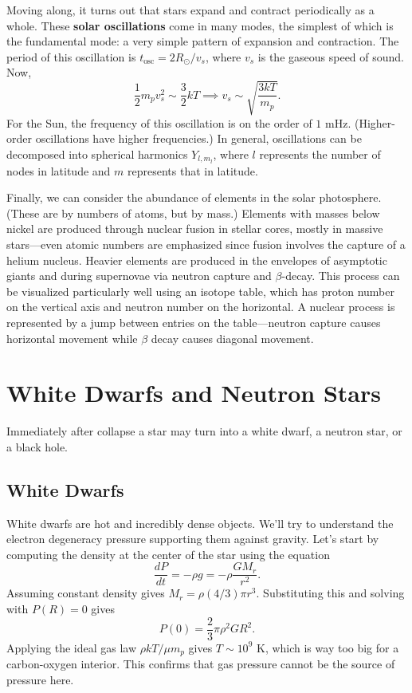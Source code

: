 \documentclass[../a062main.tex]{subfiles}
\begin{document}
Moving along, it turns out that stars expand and contract periodically as a whole.
These \textbf{solar oscillations} come in many modes, the simplest of which is the fundamental mode: a very simple pattern of expansion and contraction.
The period of this oscillation is $t_\text{osc} = 2R_\odot / v_s$, where $v_s$ is the gaseous speed of sound.
Now,
\[ \frac{1}{2} m_p v_s^2 \sim \frac{3}{2} kT \implies v_s \sim \sqrt{\frac{3kT}{m_p}}. \]
For the Sun, the frequency of this oscillation is on the order of $1 \text{ mHz}$.
(Higher-order oscillations have higher frequencies.)
In general, oscillations can be decomposed into spherical harmonics $Y_{l,m_l}$, where $l$ represents the number of nodes in latitude and $m$ represents that in latitude.

Finally, we can consider the abundance of elements in the solar photosphere.
(These are by numbers of atoms, but by mass.)
Elements with masses below nickel are produced through nuclear fusion in stellar cores, mostly in massive stars---even atomic numbers are emphasized since fusion involves the capture of a helium nucleus.
Heavier elements are produced in the envelopes of asymptotic giants and during supernovae via neutron capture and $\beta$-decay.
This process can be visualized particularly well using an isotope table, which has proton number on the vertical axis and neutron number on the horizontal.
A nuclear process is represented by a jump between entries on the table---neutron capture causes horizontal movement while $\beta$ decay causes diagonal movement.

\section{White Dwarfs and Neutron Stars}
Immediately after collapse a star may turn into a white dwarf, a neutron star, or a black hole.

\subsection*{White Dwarfs}
White dwarfs are hot and incredibly dense objects.
We'll try to understand the electron degeneracy pressure supporting them against gravity.
Let's start by computing the density at the center of the star using the equation
\[ \frac{dP}{dt} = -\rho g = -\rho \frac{GM_r}{r^2}. \]
Assuming constant density gives $M_r = \rho (4 / 3) \pi r^3$.
Substituting this and solving with $P(R) = 0$ gives
\[ \boxed{P(0) = \frac{2}{3} \pi \rho^2 G R^2}. \]
Applying the ideal gas law $\rho k T / \mu m_p$ gives $T \sim 10^{9} \text{ K}$, which is way too big for a carbon-oxygen interior.
This confirms that gas pressure cannot be the source of pressure here.
\end{document}
